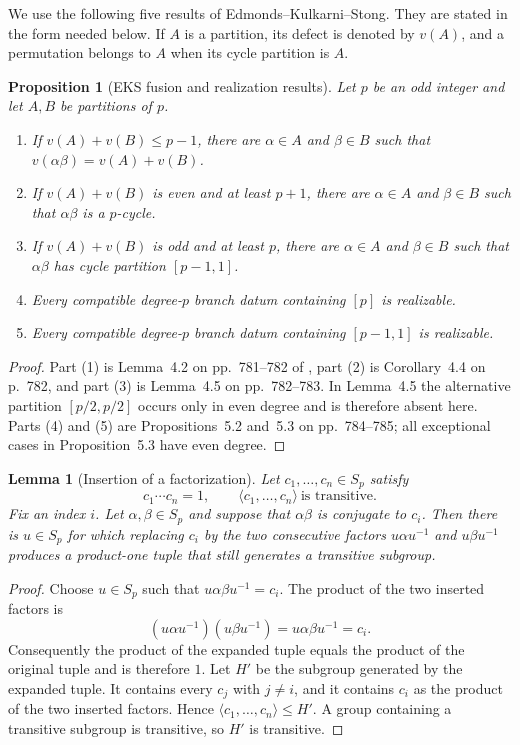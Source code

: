 \documentclass[10pt,a4paper]{amsart}
\newtheorem{lemma}[theorem]{Lemma}
\newtheorem{proposition}[theorem]{Proposition}
\numberwithin{equation}{section}
\begin{document}
We use the following five results of Edmonds--Kulkarni--Stong.  They are
stated in the form needed below.  If $A$ is a partition, its defect is
denoted by $v(A)$, and a permutation belongs to $A$ when its cycle partition
is $A$.

\begin{proposition}[EKS fusion and realization results]
\label{prop:EKS-inputs}
Let $p$ be an odd integer and let $A,B$ be partitions of $p$.
\begin{enumerate}
\item If $v(A)+v(B)\leq p-1$, there are $\alpha\in A$ and
$\beta\in B$ such that $v(\alpha\beta)=v(A)+v(B)$.
\item If $v(A)+v(B)$ is even and at least $p+1$, there are
$\alpha\in A$ and $\beta\in B$ such that $\alpha\beta$ is a $p$-cycle.
\item If $v(A)+v(B)$ is odd and at least $p$, there are
$\alpha\in A$ and $\beta\in B$ such that $\alpha\beta$ has cycle
partition $[p-1,1]$.
\item Every compatible degree-$p$ branch datum containing $[p]$ is
realizable.
\item Every compatible degree-$p$ branch datum containing $[p-1,1]$ is
realizable.
\end{enumerate}
\end{proposition}

\begin{proof}
Part (1) is Lemma~4.2 on pp.~781--782 of \cite{EKS}, part (2) is
Corollary~4.4 on p.~782, and part (3) is Lemma~4.5 on pp.~782--783.  In
Lemma~4.5 the alternative partition
$[p/2,p/2]$ occurs only in even degree and is therefore absent here.
Parts (4) and (5) are Propositions~5.2 and~5.3 on pp.~784--785; all
exceptional cases in Proposition~5.3 have even degree.
\end{proof}

\begin{lemma}[Insertion of a factorization]
\label{lem:factor-insertion}
Let $c_1,\ldots,c_n\in S_p$ satisfy
\[
 c_1\cdots c_n=1,
 \qquad
 \langle c_1,\ldots,c_n\rangle\ \text{is transitive}.
\]
Fix an index $i$.  Let
$\alpha,\beta\in S_p$ and suppose that $\alpha\beta$ is conjugate to $c_i$.
Then there is $u\in S_p$ for which replacing $c_i$ by the two consecutive
factors $u\alpha u^{-1}$ and $u\beta u^{-1}$ produces a product-one tuple
that still generates a transitive subgroup.
\end{lemma}

\begin{proof}
Choose $u\in S_p$ such that $u\alpha\beta u^{-1}=c_i$.  The product of the
two inserted factors is
\[
 (u\alpha u^{-1})(u\beta u^{-1})
   =u\alpha\beta u^{-1}=c_i.
\]
Consequently the product of the expanded tuple equals the product of the
original tuple and is therefore $1$.  Let $H'$ be the subgroup generated by
the expanded tuple.  It contains every $c_j$ with $j\ne i$, and it contains
$c_i$ as the product of the two inserted factors.  Hence
$\langle c_1,\ldots,c_n\rangle\leq H'$.  A group containing a transitive
subgroup is transitive, so $H'$ is transitive.
\end{proof}
\end{document}
